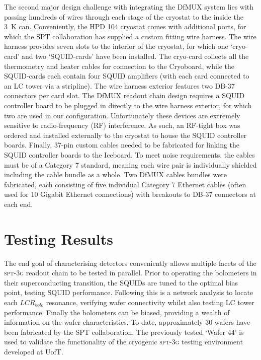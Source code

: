 \documentclass[iop]{emulateapj}
\begin{document}
The second major design challenge with integrating the DfMUX system lies with passing hundreds of wires through each stage of the cryostat to the inside the 3~K can.  Conveniently, the HPD 104 cryostat comes with additional ports, for which the SPT collaboration has supplied a custom fitting wire harness.  The wire harness provides seven slots to the interior of the cryostat, for which one `cryo-card' and two `SQUID-cards' have been installed.  The cryo-card collects all the thermometry and heater cables for connection to the Cryoboard, while the SQUID-cards each contain four SQUID amplifiers (with each card connected to an LC tower via a stripline).  The wire harness exterior features two DB-37 connectors per card slot.  The DfMUX readout chain design requires a SQUID controller board to be plugged in directly to the wire harness exterior, for which two are used in our configuration.  Unfortunately these devices are extremely sensitive to radio-frequency (RF) interference.  As such, an RF-tight box was ordered and installed externally to the cryostat to house the SQUID controller boards.  Finally, 37-pin custom cables needed to be fabricated for linking the SQUID controller boards to the Iceboard.  To meet noise requirements, the cables must be of a Category 7 standard, meaning each wire pair is individually shielded including the cable bundle as a whole.  Two DfMUX cables bundles were fabricated, each consisting of five individual Category 7 Ethernet cables (often used for 10 Gigabit Ethernet connections) with breakouts to DB-37 connectors at each end.

\section{Testing Results}
\label{results_section}

The end goal of characterising detectors conveniently allows multiple facets of the \textsc{spt-3g} readout chain to be tested in parallel.  Prior to operating the bolometers in their superconducting transition, the SQUIDs are tuned to the optimal bias point, testing SQUID performance.  Following this is a network analysis to locate each $LCR_{bolo}$ resonance, verifying wafer connectivity whilst also testing LC tower performance.  Finally the bolometers can be biased, providing a wealth of information on the wafer characteristics.  To date, approximately 30 wafers have been fabricated by the SPT collaboration.  The previously tested `Wafer 44' is used to validate the functionality of the cryogenic \textsc{spt-3g} testing environment developed at UofT.
\end{document}
